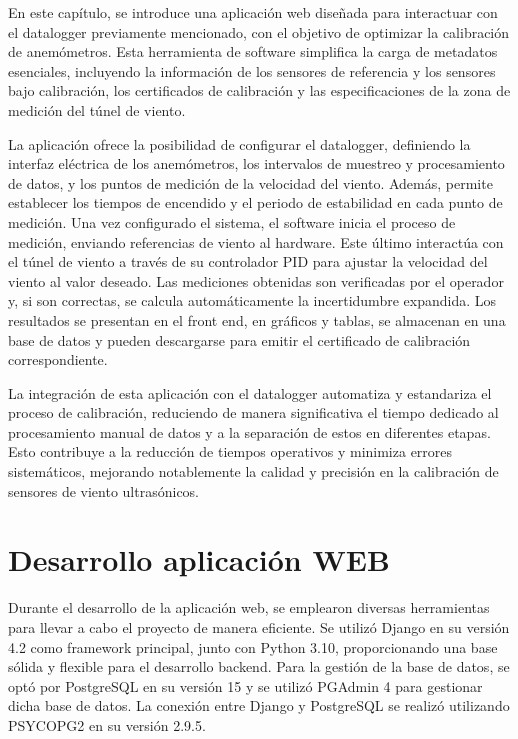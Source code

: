 En este capítulo, se introduce una aplicación web diseñada para interactuar con el datalogger previamente mencionado, con el objetivo de optimizar la calibración de anemómetros. Esta herramienta de software simplifica la carga de metadatos esenciales, incluyendo la información de los sensores de referencia y los sensores bajo calibración, los certificados de calibración y las especificaciones de la zona de medición del túnel de viento.

La aplicación ofrece la posibilidad de configurar el datalogger, definiendo la interfaz eléctrica de los anemómetros, los intervalos de muestreo y procesamiento de datos, y los puntos de medición de la velocidad del viento. Además, permite establecer los tiempos de encendido y el periodo de estabilidad en cada punto de medición. Una vez configurado el sistema, el software inicia el proceso de medición, enviando referencias de viento al hardware. Este último interactúa con el túnel de viento a través de su controlador PID para ajustar la velocidad del viento al valor deseado. Las mediciones obtenidas son verificadas por el operador y, si son correctas, se calcula automáticamente la incertidumbre expandida. Los resultados se presentan en el front end, en gráficos y tablas, se almacenan en una base de datos y pueden descargarse para emitir el certificado de calibración correspondiente.

La integración de esta aplicación con el datalogger automatiza y estandariza el proceso de calibración, reduciendo de manera significativa el tiempo dedicado al procesamiento manual de datos y a la separación de estos en diferentes etapas. Esto contribuye a la reducción de tiempos operativos y minimiza errores sistemáticos, mejorando notablemente la calidad y precisión en la calibración de sensores de viento ultrasónicos.

\section{Desarrollo aplicación WEB}
Durante el desarrollo de la aplicación web, se emplearon diversas herramientas para llevar a cabo el proyecto de manera eficiente. Se utilizó Django en su versión 4.2 como framework principal, junto con Python 3.10, proporcionando una base sólida y flexible para el desarrollo backend. Para la gestión de la base de datos, se optó por PostgreSQL en su versión 15 y se utilizó PGAdmin 4 para gestionar dicha base de datos. La conexión entre Django y PostgreSQL se realizó utilizando PSYCOPG2 en su versión 2.9.5.

